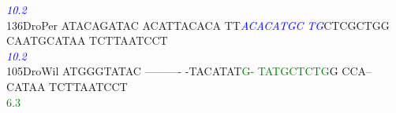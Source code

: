 \documentclass[11pt,twoside,reqno,a4paper]{article}
\begin{document}
{\hspace*{4\charwidth}\hspace*{7\charwidth}\hspace*{1\charwidth}\hspace*{1\charwidth}\hspace*{22\charwidth}\textit{\textcolor{blue}{10.2}}\hspace*{1\charwidth}\hspace*{1\charwidth}\hspace*{1\charwidth}\hspace*{1\charwidth}\\
136\hspace*{1\charwidth}DroPer	ATACAGATAC	ACATTACACA	TT\textit{\textcolor{blue}{A}}\textit{\textcolor{blue}{C}}\textit{\textcolor{blue}{A}}\textit{\textcolor{blue}{C}}\textit{\textcolor{blue}{A}}\textit{\textcolor{blue}{T}}\textit{\textcolor{blue}{G}}\textit{\textcolor{blue}{C}}	\textit{\textcolor{blue}{T}}\textit{\textcolor{blue}{G}}CTCGCTGG	CAATGCATAA	TCTTAATCCT	\\
\hspace*{4\charwidth}\hspace*{7\charwidth}\hspace*{1\charwidth}\hspace*{1\charwidth}\hspace*{22\charwidth}\textit{\textcolor{blue}{10.2}}\hspace*{1\charwidth}\hspace*{1\charwidth}\hspace*{1\charwidth}\hspace*{1\charwidth}\\
105\hspace*{1\charwidth}DroWil	ATGGGTATAC	----------	-TACATAT\textcolor{green}{G}\textcolor{green}{-}	\textcolor{green}{T}\textcolor{green}{A}\textcolor{green}{T}\textcolor{green}{G}\textcolor{green}{C}\textcolor{green}{T}\textcolor{green}{C}\textcolor{green}{T}\textcolor{green}{G}G	CCA--CATAA	TCTTAATCCT	\\
\hspace*{4\charwidth}\hspace*{7\charwidth}\hspace*{1\charwidth}\hspace*{1\charwidth}\hspace*{28\charwidth}\textcolor{green}{6.3}\hspace*{1\charwidth}\hspace*{1\charwidth}\hspace*{1\charwidth}\hspace*{1\charwidth}\\
}
\end{document}
